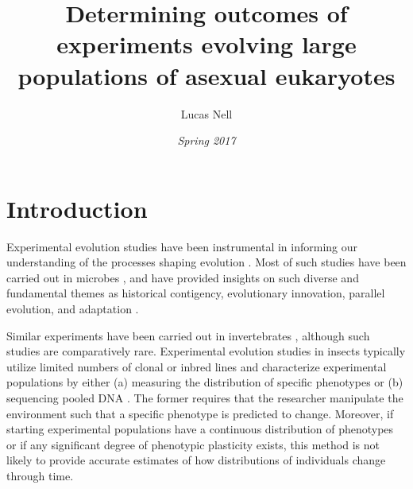                           
\iffalse
cd ./_paper
xelatex paper && biber paper && xelatex paper
rm *.log *.bcf *.aux *.bbl *.blg *.run.xml
\fi





\title{\vspace*{-3ex}Determining outcomes of experiments evolving large populations of
asexual eukaryotes}
\author{Lucas Nell}
\date{\vspace*{-3ex}\emph{Spring 2017}}




\maketitle

\raggedright

\section{Introduction}


Experimental evolution studies have been instrumental in informing our understanding
of the processes shaping evolution \citep{Elena:2003fr}. 
Most of such studies have been carried out in microbes
\citep[reviewed in][]{Dettman:2012gt,Jerison:2015kw}, and have provided insights on
such diverse and fundamental themes as historical contigency, evolutionary innovation,
parallel evolution, and adaptation
\citep{Blount:2008fo,Barrick:2009in,TollRiera:2016fd,Voordeckers:2015cl,Gerstein:2012ki}.


Similar experiments have been carried out in invertebrates
\citep{Gompert:2016eg,Chandler:2014bn,Burke:2010eq,Kang:2016ea,Rouchet:2014jl}, 
although such studies are comparatively rare.
Experimental evolution studies in insects typically utilize limited numbers of 
clonal or inbred lines \citep[e.g.,][]{Rouchet:2014jl,Kang:2016ea} and 
characterize experimental populations by either 
(a) measuring the distribution of specific phenotypes \citep[e.g.,][]{Rouchet:2014jl}
or
(b) sequencing pooled DNA \citep[``Pool-seq''; e.g.,][]{Burke:2010eq}.
The former requires that the researcher manipulate the environment such that a 
specific phenotype is predicted to change.
Moreover, if starting experimental populations have a continuous distribution of
phenotypes or if any significant degree of phenotypic plasticity exists, this method
is not likely to provide accurate estimates of how distributions of individuals change
through time.

